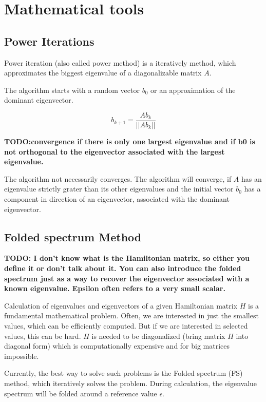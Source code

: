 \chapter{Mathematical tools}
\section{Power Iterations}
\label{sec:powerIterations}

Power iteration (also called power method) is a iteratively method, 
which approximates the biggest eigenvalue of a diagonalizable matrix $A$.

The algorithm starts with a random vector $b_0$ or an approximation of the dominant eigenvector.

\begin{equation}
    \label{eq:powerIterations}
    b_{k+1} = \frac{Ab_k}{||Ab_k||}
\end{equation}

\textbf{TODO:convergence if there is only one largest eigenvalue and if b0 is not orthogonal to the eigenvector associated with the largest eigenvalue.}

The algorithm not necessarily converges. The algorithm will converge, if $A$ has an eigenvalue strictly grater than its other eigenvalues
and the initial vector $b_0$ has a component in direction of an eigenvector, associated with the dominant eigenvector.

\section{Folded spectrum Method}

\textbf{TODO: I don't know what is the Hamiltonian matrix, so either you define it or don't talk about it. 
You can also introduce the folded spectrum just as a way to recover the eigenvector associated with a known eigenvalue. Epsilon often refers to a very small scalar.}


\label{sec:FoldedSpectrumMethod}
Calculation of eigenvalues and eigenvectors of a given Hamiltonian matrix $H$ 
is a fundamental mathematical problem. Often, we are interested in just the smallest 
values, which can be efficiently computed. But if we are interested in selected values,
this can be hard. $H$ is needed to be diagonalized (bring matrix $H$ into diagonal form) 
which is computationally expensive and for big matrices impossible.

Currently, the best way to solve such problems is the Folded spectrum (FS)\cite{foldedSpectrumMethod} method,
which iteratively solves the problem. During calculation, the eigenvalue spectrum will be folded around a reference 
value $\epsilon$.

